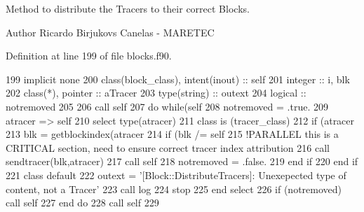 Method to distribute the Tracers to their correct Blocks. 

\begin{DoxyAuthor}{Author}
Ricardo Birjukovs Canelas -\/ M\+A\+R\+E\+T\+EC 
\end{DoxyAuthor}


Definition at line 199 of file blocks.\+f90.


\begin{DoxyCode}
199     \textcolor{keywordtype}{implicit none}
200     \textcolor{keywordtype}{class}(block\_class), \textcolor{keywordtype}{intent(inout)} :: self
201     \textcolor{keywordtype}{integer} :: i, blk
202     \textcolor{keywordtype}{class}(*), \textcolor{keywordtype}{pointer} :: aTracer
203     \textcolor{keywordtype}{type}(string) :: outext
204     \textcolor{keywordtype}{logical} :: notremoved
205     
206     \textcolor{keyword}{call }self%
207     \textcolor{keywordflow}{do} \textcolor{keywordflow}{while}(self%
208         notremoved = .true.
209         atracer => self%
210         \textcolor{keywordflow}{select type}(atracer)
211 \textcolor{keywordflow}{        class is} (tracer\_class)
212             \textcolor{keywordflow}{if} (atracer%
213                 blk = getblockindex(atracer%
214                 \textcolor{keywordflow}{if} (blk /= self%
215                     \textcolor{comment}{!PARALLEL this is a CRITICAL section, need to ensure correct tracer index attribution}
216                     \textcolor{keyword}{call }sendtracer(blk,atracer)
217                     \textcolor{keyword}{call }self%
218                     notremoved = .false.
219 \textcolor{keywordflow}{                end if}
220 \textcolor{keywordflow}{            end if}
221 \textcolor{keywordflow}{            class default}
222             outext = \textcolor{stringliteral}{'[Block::DistributeTracers]: Unexepected type of content, not a Tracer'}
223             \textcolor{keyword}{call }log%
224             stop
225 \textcolor{keywordflow}{        end select}
226         \textcolor{keywordflow}{if} (notremoved) \textcolor{keyword}{call }self%
227 \textcolor{keywordflow}{    end do}
228     \textcolor{keyword}{call }self%
229     
\end{DoxyCode}
